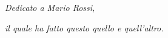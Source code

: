 \thispagestyle{empty}

\vspace*{\fill}


\noindent \begin{center}
\textit{Dedicato a Mario Rossi,}
\par\end{center}

\noindent \begin{center}
\textit{il quale ha fatto questo quello e quell'altro.}
\par\end{center}

\vspace*{\fill}


